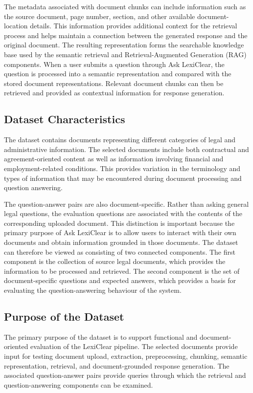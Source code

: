 \documentclass[12pt,a4paper,oneside]{report}
\begin{document}
The metadata associated with document chunks can include information such as
the source document, page number, section, and other available
document-location details. This information provides additional context for
the retrieval process and helps maintain a connection between the generated
response and the original document. The resulting representation forms the searchable knowledge base used by the
semantic retrieval and Retrieval-Augmented Generation (RAG) components.
When a user submits a question through Ask LexiClear, the question is
processed into a semantic representation and compared with the stored
document representations. Relevant document chunks can then be retrieved and
provided as contextual information for response generation.

\subsection{Dataset Characteristics}

The dataset contains documents representing different categories of legal and
administrative information. The selected documents include both contractual
and agreement-oriented content as well as information involving financial and
employment-related conditions. This provides variation in the terminology and
types of information that may be encountered during document processing and
question answering.

The question-answer pairs are also document-specific. Rather than asking
general legal questions, the evaluation questions are associated with the
contents of the corresponding uploaded document. This distinction is
important because the primary purpose of Ask LexiClear is to allow users to
interact with their own documents and obtain information grounded in those
documents. The dataset can therefore be viewed as consisting of two connected
components. The first component is the collection of source legal documents,
which provides the information to be processed and retrieved. The second
component is the set of document-specific questions and expected answers,
which provides a basis for evaluating the question-answering behaviour of the
system.

\subsection{Purpose of the Dataset}

The primary purpose of the dataset is to support functional and
document-oriented evaluation of the LexiClear pipeline. The selected
documents provide input for testing document upload, extraction,
preprocessing, chunking, semantic representation, retrieval, and
document-grounded response generation. The associated question-answer pairs
provide queries through which the retrieval and question-answering components
can be examined.
\end{document}
